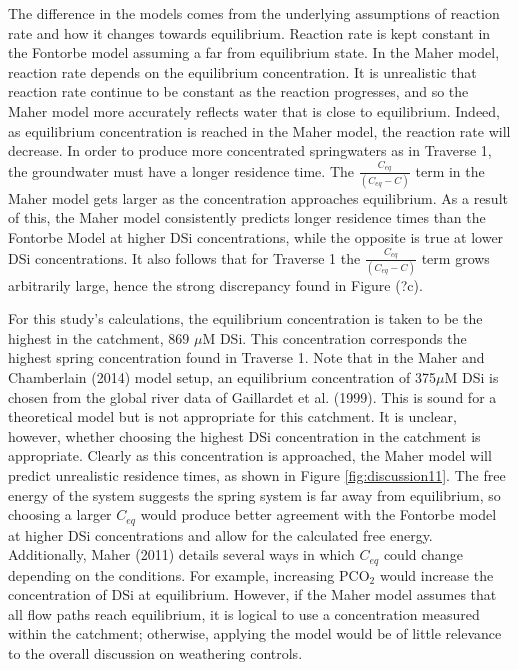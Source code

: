 The difference in the models comes from the underlying assumptions of reaction rate and how it changes towards equilibrium. Reaction rate is kept constant in the Fontorbe model assuming a far from equilibrium state. In the Maher model, reaction rate depends on the equilibrium concentration. It is unrealistic that reaction rate continue to be constant as the reaction progresses, and so the Maher model more accurately reflects water that is close to equilibrium. Indeed, as equilibrium concentration is reached in the Maher model, the reaction rate will decrease. In order to produce more concentrated springwaters as in Traverse 1, the groundwater must have a longer residence time. The $\frac{C_{eq}}{(C_{eq} - C)}$ term in the Maher model gets larger as the concentration approaches equilibrium. As a result of this, the Maher model consistently predicts longer residence times than the Fontorbe Model at higher DSi concentrations, while the opposite is true at lower DSi concentrations. It also follows that for Traverse 1 the $\frac{C_{eq}}{(C_{eq} - C)}$ term grows arbitrarily large, hence the strong discrepancy found in Figure (?c).

\bsk

For this study's calculations, the equilibrium concentration is taken to be the highest in the catchment, 869 $\mu$M DSi. This concentration corresponds the highest spring concentration found in Traverse 1. Note that in the Maher and Chamberlain (2014) model setup, an equilibrium concentration of 375$\mu$M DSi is chosen from the global river data of Gaillardet et al. (1999). This is sound for a theoretical model but is not appropriate for this catchment. It is unclear, however, whether choosing the highest DSi concentration in the catchment is appropriate. Clearly as this concentration is approached, the Maher model will predict unrealistic residence times, as shown in Figure \ref{fig:discussion11}. The free energy of the system suggests the spring system is far away from equilibrium, so choosing a larger $C_{eq}$ would produce better agreement with the Fontorbe model at higher DSi concentrations and allow for the calculated free energy. Additionally, Maher (2011) details several ways in which $C_{eq}$ could change depending on the conditions. For example, increasing PCO$_2$ would increase the concentration of DSi at equilibrium. However, if the Maher model assumes that all flow paths reach equilibrium, it is logical to use a concentration measured within the catchment; otherwise, applying the model would be of little relevance to the overall discussion on weathering controls.


